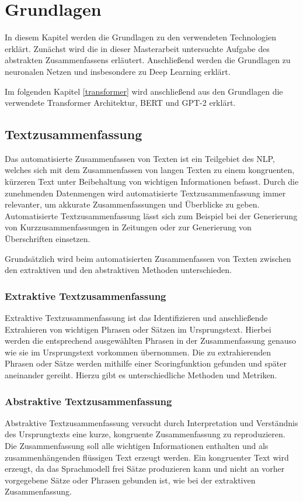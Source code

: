 \section{Grundlagen}\raggedbottom
In diesem Kapitel werden die Grundlagen zu den verwendeten Technologien erklärt. Zunächst wird die in dieser Masterarbeit untersuchte Aufgabe des abstrakten Zusammenfassens erläutert.
Anschließend werden die Grundlagen zu neuronalen Netzen und insbesondere zu Deep Learning erklärt. 

Im folgenden Kapitel \ref*{transformer} wird anschließend aus den Grundlagen die verwendete Transformer Architektur, BERT und GPT-2 erklärt.


\subsection{Textzusammenfassung}
Das automatisierte Zusammenfassen von Texten ist ein Teilgebiet des NLP, welches sich mit dem Zusammenfassen von langen Texten zu einem kongruenten, kürzeren Text unter Beibehaltung von wichtigen Informationen befasst. 
Durch die zunehmenden Datenmengen wird automatisierte Textzusammenfassung immer relevanter, um akkurate Zusammenfassungen und Überblicke zu geben.
Automatisierte Textzusammenfassung lässt sich zum Beispiel bei der Generierung von Kurzzusammenfassungen in Zeitungen oder zur Generierung von Überschriften einsetzen.

Grundsätzlich wird beim automatisierten Zusammenfassen von Texten zwischen den extraktiven und den abstraktiven Methoden unterschieden.


\subsubsection{Extraktive Textzusammenfassung}
Extraktive Textzusammenfassung ist das Identifizieren und anschließende Extrahieren von wichtigen Phrasen oder Sätzen im Ursprungstext.
Hierbei werden die entsprechend ausgewählten Phrasen in der Zusammenfassung genauso wie sie im Ursprungstext vorkommen übernommen.
Die zu extrahierenden Phrasen oder Sätze werden mithilfe einer Scoringfunktion gefunden und später aneinander gereiht. Hierzu gibt es unterschiedliche Methoden und Metriken.

\subsubsection{Abstraktive Textzusammenfassung}
Abstraktive Textzusammenfassung versucht durch Interpretation und Verständnis des Ursprungtexts eine kurze, kongruente Zusammenfassung zu reproduzieren. 
Die Zusammenfassung soll alle wichtigen Informationen enthalten und als zusammenhängenden flüssigen Text erzeugt werden. Ein kongruenter Text wird erzeugt, da das Sprachmodell frei Sätze produzieren kann und nicht an vorher vorgegebene Sätze oder Phrasen gebunden ist, wie bei der extraktiven Zusammenfassung.

